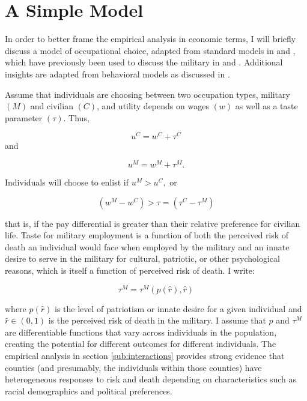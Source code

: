 \documentclass[12pt] {article}
\begin{document}
\section{A Simple Model\label{sec:Model}}


In order to better frame the empirical analysis in economic terms,
I will briefly discuss a model of occupational choice, adapted from
standard models in \cite{Roy} and \cite{RosenOccChoiceHandbook},
which have previously been used to discuss the military in \cite{Handbook}
and \cite{FisherDraftModelAER1969}. Additional insights are adapted
from behavioral models as discussed in \cite{StefanoPsychReview}. 

Assume that individuals are choosing between two occupation types,
military $(M)$ and civilian $(C)$, and utility depends on wages
$(w)$ as well as a taste parameter $(\tau)$. Thus, 


\begin{equation}
u^{C}=w^{C}+\tau^{C}
\end{equation}
 and 

\begin{equation}
u^{M}=w^{M}+\tau^{M}.
\end{equation}


Individuals will choose to enlist if $u^{M}>u^{C},$ or

\begin{equation}
(w^{M}-w^{C})>\tau=(\tau^{C}-\tau^{M})\label{eq:main eqn}
\end{equation}



that is, if the pay differential is greater than their relative preference
for civilian life. Taste for military employment is a function of
both the perceived risk of death an individual would face when employed
by the military and an innate desire to serve in the military for
cultural, patriotic, or other psychological reasons, which is itself
a function of perceived risk of death. I write:


\begin{equation}
\tau^{M}=\tau^{M}(p(\hat{r}),\hat{r})
\end{equation}



where $p(\hat{r})$ is the level of patriotism or innate desire for
a given individual and $\hat{r}\in(0,1)$ is the perceived risk of
death in the military. I assume that $p$ and $\tau^{M}$ are differentiable
functions that vary across individuals in the population, creating
the potential for different outcomes for different individuals. The
empirical analysis in section \ref{sub:interactions} provides strong
evidence that counties (and presumably, the individuals within those
counties) have heterogeneous responses to risk and death depending
on characteristics such as racial demographics and political preferences. 
\end{document}
